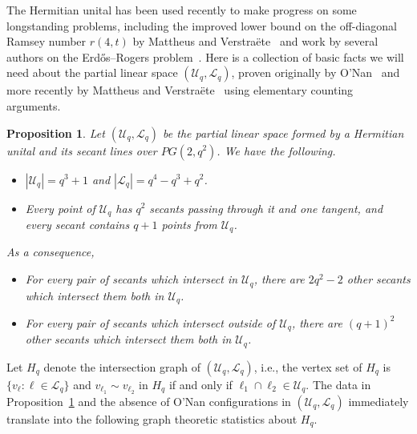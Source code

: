 \documentclass[A4paper,reqno,oneside,12pt]{amsart}
\theoremstyle{plain}
\newtheorem{proposition}[theorem]{Proposition}
\theoremstyle{definition}
\newcommand{\scL}{\mathscr{L}}
\newcommand{\scU}{\mathscr{U}}
\def\l{\ell}
\begin{document}
The Hermitian unital has been used recently to make progress on some longstanding problems, including the improved lower bound on the off-diagonal Ramsey number $r(4,t)$ by Mattheus and Verstra\"ete~\cite{MV24} and work by several authors on the Erd\H{o}s--Rogers problem~\cite{JS25, MV25}.
Here is a collection of basic facts we will need about the partial linear space $(\scU_q, \scL_q)$, proven originally by O'Nan~\cite{O72} and more recently by Mattheus and Verstra\"ete~\cite{MV24} using elementary counting arguments.

\begin{proposition}
\label{prp: unital}
    Let $(\scU_q, \scL_q)$ be the partial linear space formed by a Hermitian unital and its secant lines over $PG(2,q^2)$.
    We have the following.
    \begin{itemize}
        \item[i.] $|\scU_q| = q^3 + 1$ and $|\scL_q| = q^4 - q^3 + q^2$.
        \item[ii.] Every point of $\scU_q$ has $q^2$ secants passing through it and one tangent, and every secant contains $q+1$ points from $\scU_q$.
    \end{itemize}
    As a consequence,
    \begin{itemize}
        \item[iii.] For every pair of secants which intersect in $\scU_q$, there are $2q^2-2$ other secants which intersect them both in $\scU_q$.
        \item[iv.] For every pair of secants which intersect outside of $\scU_q$, there are $(q+1)^2$ other secants which intersect them both in $\scU_q$.
    \end{itemize}
\end{proposition}

\noindent Let $H_q$ denote the intersection graph of $(\scU_q, \scL_q)$, i.e., the vertex set of $H_q$ is $\{v_\l: \l \in \scL_q\}$ and $v_{\l_1} \sim v_{\l_2}$ in $H_q$ if and only if $\l_1 \cap \l_2 \in \scU_q$.
The data in Proposition~\ref{prp: unital} and the absence of O'Nan configurations in $(\scU_q, \scL_q)$ immediately translate into the following graph theoretic statistics about $H_q$.
\end{document}
